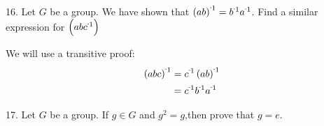 \begin{mdframed}[style=darkAnswer,frametitle={Joe Starr}]
\begin{itemize}[align=left]
{          }
                    
  \end{itemize}
\end{mdframed}
\newpage
\begin{mdframed}[style=darkQuesion]
  16. Let $G$ be a group. We have shown that $\inv{\lrp{ab}}=\inv{b}\inv{a}$. 
  Find a similar expression for $\lrp{\inv{abc}}$
\end{mdframed}

\begin{mdframed}[style=darkAnswer,frametitle={Joe Starr}]
  We will use a transitive proof: 
  \begin{align*}
    \inv{\lrp{abc}} & = \inv{c}\inv{\lrp{ab}} \\
                    & = \inv{c}\inv{b}\inv{a} 
  \end{align*}
\end{mdframed}
\newpage
\begin{mdframed}[style=darkQuesion]
  17. Let $G$ be a group. If $g\in G$ and $g^2=g$,then prove that $g=e$.
\end{mdframed}

